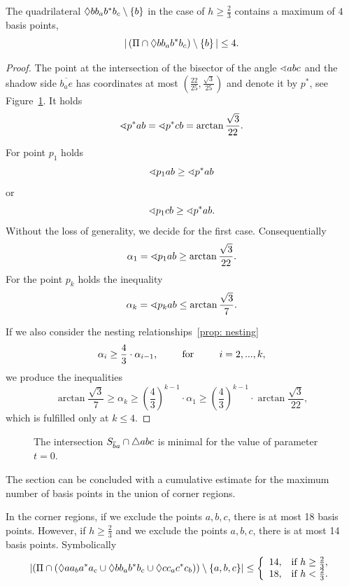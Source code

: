\begin{proposition}
The quadrilateral $\Diamond{bb_{a}b^{*}b_{c}} \setminus \left\{ b \right\}$ in the case of $h \geq \frac{2}{3}$ contains a maximum of $4$ basis points,
$$
|\left(\Pi \cap \Diamond{bb_{a}b^{*}b_{c}}\right) \setminus \left\{ b \right\}| \leq 4.
$$
\end{proposition}

\begin{proof}
The point at the intersection of the bisector of the angle $\sphericalangle{abc}$ and the shadow side $\overline{b_{a}e}$ has coordinates at most $(\frac{22}{25},\frac{\sqrt{3}}{25})$ and denote it by $p^{*}$, see Figure~\ref{fig: improvement-3}. It holds
$$
\sphericalangle{p^{*}ab} = \sphericalangle{p^{*}cb} = \arctan{\frac{\sqrt{3}}{22}}.
$$

For point $p_{1}$ holds
$$
\sphericalangle{p_{1}ab} \geq \sphericalangle{p^{*}ab}
$$
or
$$
\sphericalangle{p_{1}cb} \geq \sphericalangle{p^{*}ab}.
$$
Without the loss of generality, we decide for the first case. Consequentially
$$
\alpha_{1} = \sphericalangle{p_{1}ab} \geq \arctan{\frac{\sqrt{3}}{22}}.
$$
For the point $p_{k}$ holds the inequality
$$
\alpha_{k} = \sphericalangle{p_{k}ab} \leq \arctan{\frac{\sqrt{3}}{7}}.
$$

If we also consider the nesting relationships~\ref{prop: nesting}
$$
\alpha_{i} \geq \frac{4}{3} \cdot \alpha_{i-1} \text{,\hspace{0.8cm}   for   \hspace{0.8cm}} i = 2,...,k,
$$
we produce the inequalities
$$
\arctan{\frac{\sqrt{3}}{7}} \geq \alpha_{k} \geq \left(\frac{4}{3}\right)^{k-1} \cdot \alpha_{1} \geq \left(\frac{4}{3}\right)^{k-1} \cdot \arctan{\frac{\sqrt{3}}{22}},
$$
which is fulfilled only at $k \leq 4$.
\end{proof}

\begin{figure}
\begin{center}

\end{center}
\caption{The intersection $S_{\overline{b}a} \cap \triangle{abc}$ is minimal for the value of parameter $t = 0$.}
\label{fig: improvement-3}
\end{figure}

The section can be concluded with a cumulative estimate for the maximum number of basis points in the union of corner regions.

\begin{proposition}
\label{prop: corner-regions-union}
In the corner regions, if we exclude the points $a,b,c$, there is at most 18 basis points. However, if $h \geq \frac{2}{3}$ and we exclude the points $a,b,c$, there is at most 14 basis points. Symbolically
$$
\left|\left(\Pi \cap \left(
\Diamond{aa_{b}a^{*}a_{c}} \cup
\Diamond{bb_{a}b^{*}b_{c}} \cup
\Diamond{cc_{a}c^{*}c_{b}}
\right)\right)
\setminus \left\{ a,b,c \right\}\right| \leq \left\{ \begin{array}{ll}  14,  & \mbox{if } h \geq \frac{2}{3}, \\  18,  & \mbox{if } h < \frac{2}{3}. \end{array} \right.
$$
\end{proposition}

